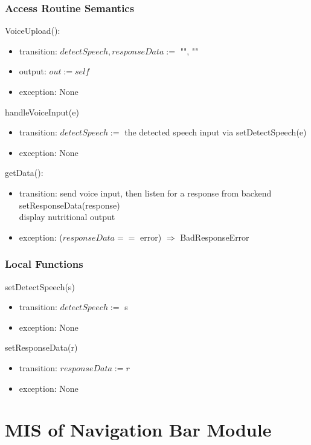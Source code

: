 \documentclass[12pt, titlepage]{article}
\begin{document}
\subsubsection{Access Routine Semantics}
\noindent VoiceUpload():
\begin{itemize}
	\item transition: $detectSpeech, responseData :=$ "", ""
	\item output: $out := self$ 
	\item exception: None
\end{itemize}
\noindent handleVoiceInput(e)
\begin{itemize}
	\item transition: $detectSpeech :=$ the detected speech input via 
	setDetectSpeech(e)
	\item exception: None
\end{itemize}
\noindent getData():
\begin{itemize}
	\item transition: send voice input, then listen for a response from 
	backend\\ setResponseData(response)\\ display nutritional output
	\item exception: ($responseData ==$ error) $\Rightarrow$ BadResponseError
\end{itemize}
\subsubsection{Local Functions}
\noindent setDetectSpeech(s)
\begin{itemize}
	\item transition: $ detectSpeech := $ s
	\item exception: None
\end{itemize}
\noindent setResponseData(r)
\begin{itemize}
	\item transition: $ responseData:=r $
	\item exception: None
\end{itemize}

\newpage

\section{MIS of Navigation Bar Module} \label{Navbar}
\end{document}
